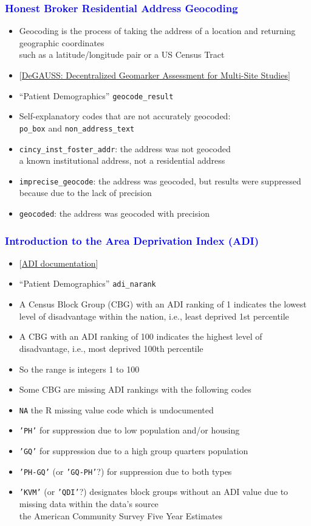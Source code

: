\documentclass[11pt,pdftex,dvipsnames,usenames]{beamer}
\begin{document}
\begin{frame}[fragile]\frametitle{\bf\textcolor{blue}{Honest Broker Residential
Address Geocoding}}
\begin{itemize}
\item Geocoding is the process of taking the address of a location and
  returning geographic coordinates\\
 such as a latitude/longitude pair or a US Census Tract
\item  
\textcolor{PineGreen}{[\href{https://degauss.org}{DeGAUSS:
    Decentralized Geomarker Assessment for Multi-Site Studies}]}
\item ``Patient Demographics'' \texttt{geocode\_result}
\item Self-explanatory codes that are not accurately geocoded:\\ 
\texttt{po\_box} and \texttt{non\_address\_text} 
\item \texttt{cincy\_inst\_foster\_addr}: the address was not geocoded \\ 
a known institutional address, not a residential address
\item \texttt{imprecise\_geocode}: the address was geocoded, but results were suppressed because due to the lack of precision
\item \texttt{geocoded}: the address was geocoded with precision
\end{itemize}
\end{frame}

\begin{frame}[fragile]\frametitle{\bf\textcolor{blue}{Introduction to
the Area Deprivation Index (ADI)}}
\begin{itemize}
\item \textcolor{PineGreen}{[\href{https://www.neighborhoodatlas.medicine.wisc.edu}{ADI documentation}]}
\item ``Patient Demographics'' \texttt{adi\_narank}
\item A Census Block Group (CBG) with an ADI ranking of 1 indicates the lowest level of disadvantage within the nation, i.e., least deprived 1st percentile
\item A CBG with an ADI ranking of 100 indicates the highest level of disadvantage, i.e., most deprived 100th percentile
\item So the range is integers 1 to 100
\item Some CBG are missing ADI rankings with the following codes
\item \texttt{NA} the R missing value code which is undocumented
\item \texttt{'PH'} for suppression due to low population and/or housing 
\item \texttt{'GQ'} for suppression due to a high group quarters population
\item \texttt{'PH-GQ'}  (or \texttt{'GQ-PH'}?) 
for suppression due to both types
\item \texttt{'KVM'} (or \texttt{'QDI'}?) 
designates block groups without an ADI value due to 
  missing data within the data's source\\
the American Community Survey Five Year Estimates
\end{itemize}
\end{frame}
\end{document}
